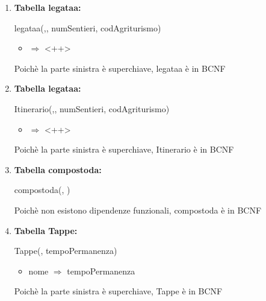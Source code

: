 \documentclass[12pt,a4paper]{article}
\begin{document}
\begin{enumerate}
\item[] \textbf{Tabella legataa:}

legataa(\underline{},\underline{}, numSentieri,  codAgriturismo)
\begin{itemize}
\vspace{-5pt}
\item <++> $\Rightarrow$ <++>
\vspace{-5pt}
\end{itemize}
Poichè la parte sinistra è superchiave, legataa è in BCNF
\vspace{10pt}



\item[] \textbf{Tabella legataa:}

Itinerario(\underline{},\underline{}, numSentieri,  codAgriturismo)
\begin{itemize}
\vspace{-5pt}
\item <++> $\Rightarrow$ <++>
\vspace{-5pt}
\end{itemize}
Poichè la parte sinistra è superchiave, Itinerario è in BCNF
\vspace{10pt}



\item[] \textbf{Tabella compostoda:}

compostoda(\underline{}, \underline{})

Poichè non esistono dipendenze funzionali, compostoda è in BCNF
\vspace{10pt}



\item[] \textbf{Tabella Tappe:}

Tappe(\underline{}, tempoPermanenza)
\begin{itemize}
\vspace{-5pt}
\item nome $\Rightarrow$ tempoPermanenza
\vspace{-5pt}
\end{itemize}
Poichè la parte sinistra è superchiave, Tappe è in BCNF
\vspace{10pt}
 



\end{enumerate}
\end{document}
